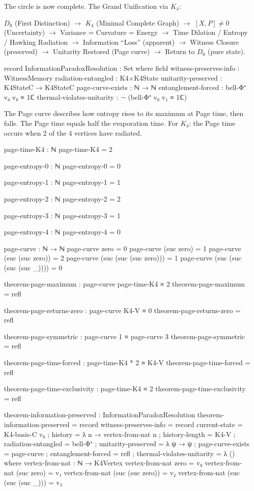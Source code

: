 \documentclass[11pt,a4paper]{book}
\begin{document}
The circle is now complete. The Grand Unification via $K_4$:

\begin{center}
$D_0$ (First Distinction) $\to$ $K_4$ (Minimal Complete Graph) $\to$ $[X,P] \neq 0$ (Uncertainty) $\to$ Variance = Curvature = Energy $\to$ Time Dilation / Entropy / Hawking Radiation $\to$ Information ``Loss'' (apparent) $\to$ Witness Closure (preserved) $\to$ Unitarity Restored (Page curve) $\to$ Return to $D_0$ (pure state).
\end{center}

\begin{code}
record InformationParadoxResolution : Set where
  field
    witness-preserves-info : WitnessMemory
    radiation-entangled : K4×K4State
    unitarity-preserved : K4StateC → K4StateC
    page-curve-exists : ℕ → ℕ
    entanglement-forced : bell-Φ⁺ v₀ v₀ ≡ 1ℂ
    thermal-violates-unitarity : ¬ (bell-Φ⁺ v₀ v₁ ≡ 1ℂ)
\end{code}

The Page curve describes how entropy rises to its maximum at Page time, then falls. The Page time equals half the evaporation time. For $K_4$: the Page time occurs when 2 of the 4 vertices have radiated.

\begin{code}
page-time-K4 : ℕ
page-time-K4 = 2

page-entropy-0 : ℕ
page-entropy-0 = 0

page-entropy-1 : ℕ
page-entropy-1 = 1

page-entropy-2 : ℕ
page-entropy-2 = 2

page-entropy-3 : ℕ
page-entropy-3 = 1

page-entropy-4 : ℕ
page-entropy-4 = 0

page-curve : ℕ → ℕ
page-curve zero = 0
page-curve (suc zero) = 1
page-curve (suc (suc zero)) = 2
page-curve (suc (suc (suc zero))) = 1
page-curve (suc (suc (suc (suc _)))) = 0

theorem-page-maximum : page-curve page-time-K4 ≡ 2
theorem-page-maximum = refl

theorem-page-returns-zero : page-curve K4-V ≡ 0
theorem-page-returns-zero = refl

theorem-page-symmetric : page-curve 1 ≡ page-curve 3
theorem-page-symmetric = refl

theorem-page-time-forced : page-time-K4 * 2 ≡ K4-V
theorem-page-time-forced = refl

theorem-page-time-exclusivity : page-time-K4 ≡ 2
theorem-page-time-exclusivity = refl

theorem-information-preserved : InformationParadoxResolution
theorem-information-preserved = record
  { witness-preserves-info = record 
      { current-state = K4-basis-C v₀
      ; history = λ n → vertex-from-nat n
      ; history-length = K4-V }
  ; radiation-entangled = bell-Φ⁺
  ; unitarity-preserved = λ ψ → ψ
  ; page-curve-exists = page-curve
  ; entanglement-forced = refl
  ; thermal-violates-unitarity = λ ()
  }
  where
    vertex-from-nat : ℕ → K4Vertex
    vertex-from-nat zero = v₀
    vertex-from-nat (suc zero) = v₁
    vertex-from-nat (suc (suc zero)) = v₂
    vertex-from-nat (suc (suc (suc _))) = v₃
\end{code}
\end{document}
